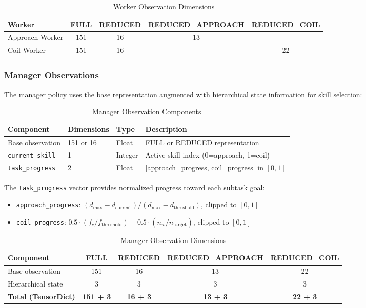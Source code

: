 \documentclass[11pt]{article}
\begin{document}
\begin{table}[H]
\centering
\caption{Worker Observation Dimensions}
\begin{tabular}{@{}lcccc@{}}
\toprule
\textbf{Worker} & \textbf{FULL} & \textbf{REDUCED} & \textbf{REDUCED\_APPROACH} & \textbf{REDUCED\_COIL} \\
\midrule
Approach Worker & 151 & 16 & 13 & --- \\
Coil Worker & 151 & 16 & --- & 22 \\
\bottomrule
\end{tabular}
\end{table}

\subsubsection{Manager Observations}

The manager policy uses the base representation augmented with hierarchical state information for skill selection:

\begin{table}[H]
\centering
\caption{Manager Observation Components}
\begin{tabular}{@{}llll@{}}
\toprule
\textbf{Component} & \textbf{Dimensions} & \textbf{Type} & \textbf{Description} \\
\midrule
Base observation & 151 or 16 & Float & FULL or REDUCED representation \\
\texttt{current\_skill} & 1 & Integer & Active skill index (0=approach, 1=coil) \\
\texttt{task\_progress} & 2 & Float & [approach\_progress, coil\_progress] in $[0,1]$ \\
\bottomrule
\end{tabular}
\end{table}

The \texttt{task\_progress} vector provides normalized progress toward each subtask goal:
\begin{itemize}
    \item \texttt{approach\_progress}: $(d_{\max} - d_{\text{current}}) / (d_{\max} - d_{\text{threshold}})$, clipped to $[0, 1]$
    \item \texttt{coil\_progress}: $0.5 \cdot (f_c / f_{\text{threshold}}) + 0.5 \cdot (n_w / n_{\text{target}})$, clipped to $[0, 1]$
\end{itemize}

\begin{table}[H]
\centering
\caption{Manager Observation Dimensions}
\begin{tabular}{@{}lcccc@{}}
\toprule
\textbf{Component} & \textbf{FULL} & \textbf{REDUCED} & \textbf{REDUCED\_APPROACH} & \textbf{REDUCED\_COIL} \\
\midrule
Base observation & 151 & 16 & 13 & 22 \\
Hierarchical state & 3 & 3 & 3 & 3 \\
\midrule
\textbf{Total (TensorDict)} & \textbf{151 + 3} & \textbf{16 + 3} & \textbf{13 + 3} & \textbf{22 + 3} \\
\bottomrule
\end{tabular}
\end{table}
\end{document}
